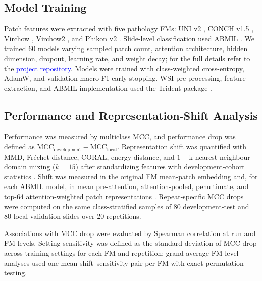 \documentclass[runningheads]{llncs}
\newcommand{\bluelink}[2]{\href{#1}{\textcolor{blue}{#2}}}
\begin{document}
\subsection{Model Training}

Patch features were extracted with five pathology FMs: UNI v2 \cite{chen2024uni}, 
CONCH v1.5 \cite{lu2024conch}, Virchow \cite{vorontsov2024virchow}, Virchow2 \cite{zimmermann2024virchow2}, and Phikon v2 \cite{filiot2024phikon2}. 
Slide-level classification used ABMIL \cite{ilse2018attention}. 
We trained 60 models varying sampled patch count, attention architecture, hidden dimension, dropout, learning rate, and weight decay; for the full details refer to the \bluelink{https://github.com/Shahryar-Noei/colorectal-fm-local-validation}{project repository}. 
Models were trained with class-weighted cross-entropy, AdamW, and validation macro-F1 early stopping. WSI pre-processing, feature extraction, and ABMIL implementation used the Trident package \cite{zhang2025standardizing,vaidya2025molecular}.

\subsection{Performance and Representation-Shift Analysis}

Performance was measured by multiclass MCC, and performance drop was defined as 
$\mathrm{MCC}_{\mathrm{development}}-\mathrm{MCC}_{\mathrm{local}}$. 
Representation shift was quantified with MMD, Fr{\'e}chet distance, CORAL, energy distance, and $1-$k-nearest-neighbour domain mixing ($k=15$) 
after standardizing features with development-cohort statistics \cite{gretton2012kernel,heusel2017gans,sun2016deepcoral,szekely2013energy}. 
Shift was measured in the original FM mean-patch embedding and, for each ABMIL model, in mean pre-attention, 
attention-pooled, penultimate, and top-64 attention-weighted patch representations \cite{poceviciute2023detecting}. 
Repeat-specific MCC drops were computed on the same class-stratified samples of 80 development-test and 80 local-validation slides over 20 repetitions.

Associations with MCC drop were evaluated by Spearman correlation at run and FM levels. 
Setting sensitivity was defined as the standard deviation of MCC drop across training settings 
for each FM and repetition; grand-average FM-level analyses used one mean shift--sensitivity pair per 
FM with exact permutation testing. 
\end{document}
